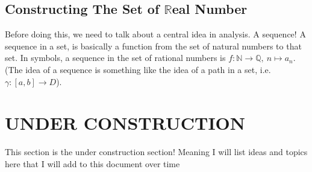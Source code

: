 \documentclass[12pt,a4paper]{article}
\newcommand{\R}{\mathbb{R}}
\newcommand{\N}{\mathbb{N}}
\newcommand{\Q}{\mathbb{Q}}
\begin{document}
	\subsection{Constructing The Set of $\R$eal Number}
	Before doing this, we need to talk about a central idea in analysis. A sequence! A sequence in a set, is basically a function from the set of natural numbers to that set. In symbols, a sequence in the set of rational numbers is $f:\N\to\Q,\ n\mapsto a_n$. (The idea of a sequence is something like the idea of a path in a set, i.e. $\gamma:[a,b]\to D$).  
	
	
	
	
	\section{UNDER CONSTRUCTION}
	This section is the under construction section! Meaning I will list ideas and topics here that I will add to this document over time
\end{document}
